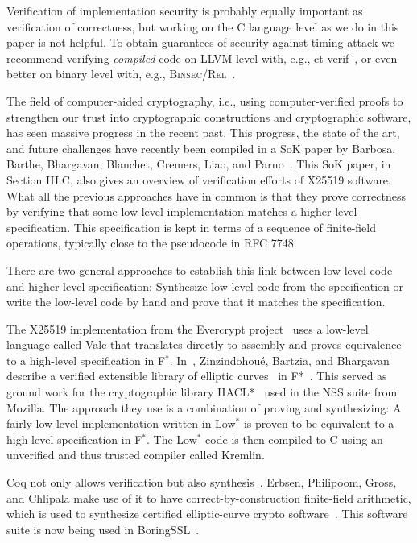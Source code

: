 Verification of implementation security is probably equally important as
verification of correctness, but working on the C language level as we do
in this paper is not helpful. To obtain guarantees of security against 
timing-attack we recommend verifying \emph{compiled} code on LLVM level with, 
e.g., ct-verif~\cite{ABB+16}, 
or even better on binary level with, e.g., \textsc{Binsec/Rel}~\cite{DBR20}.

The field of computer-aided cryptography, i.e., using computer-verified proofs
to strengthen our trust into cryptographic constructions and cryptographic software,
has seen massive progress in the recent past. This progress, the state of the art,
and future challenges have recently been compiled in a SoK paper by Barbosa,
Barthe, Bhargavan, Blanchet, Cremers, Liao, and Parno~\cite{BBB+19}.
This SoK paper, in Section III.C, also gives an overview of verification efforts of
X25519 software. What all the previous approaches have in common is that they
prove correctness by verifying that some low-level implementation matches a
higher-level specification. This specification is kept in terms of a sequence
of finite-field operations, typically close to the pseudocode in RFC 7748.

There are two general approaches to establish this link
between low-level code and higher-level specification:
Synthesize low-level code from the specification
or write the low-level code by hand and prove that it
matches the specification.

The X25519 implementation from the Evercrypt project~\cite{EverCrypt}
uses a low-level language called Vale that translates
directly to assembly and proves equivalence to a high-level specification in F$^*$.
In~\cite{Zinzindohoue2016AVE}, Zinzindohou{\'{e}}, Bartzia, and Bhargavan
describe a verified extensible library of elliptic curves~ in F*~\cite{DBLP:journals/corr/BhargavanDFHPRR17}.
This served as ground work for the cryptographic library HACL*~\cite{zinzindohoue2017hacl}
used in the NSS suite from Mozilla. The approach they use is a combination
of proving and synthesizing: A fairly low-level implementation written in
Low$^*$ is proven to be equivalent to a high-level specification in F$^*$.
The Low$^*$ code is then compiled to C using an unverified and thus trusted
compiler called Kremlin.

Coq not only allows verification but also synthesis~\cite{CpdtJFR}.
Erbsen, Philipoom, Gross, and Chlipala make use of it to have
correct-by-construction finite-field arithmetic, which is used
to synthesize certified elliptic-curve crypto software~\cite{Philipoom2018CorrectbyconstructionFF,Erbsen2017CraftingCE,Erbsen2016SystematicSO}.
This software suite is now being used in BoringSSL~\cite{fiat-crypto}.

